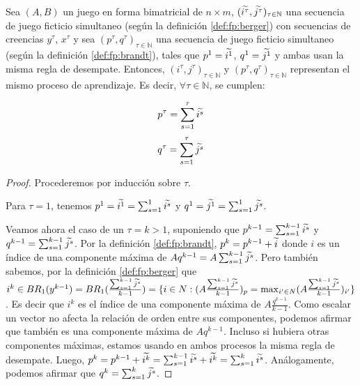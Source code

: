 \begin{lemma} \label{lema:equiv:sim}
    Sea $(A, B)$ un juego en forma bimatricial de $n \times m$, $(\widetilde{i^\tau}, \widetilde{j^\tau})_{\tau \in \mathbb{N}}$ una secuencia de juego ficticio simultaneo (según la definición \ref{def:fp:berger}) con secuencias de creencias $y^\tau$, $x^\tau$ y sea $(p^\tau, q^\tau)_{\tau \in \mathbb{N}}$ una secuencia de juego ficticio simultaneo (según la definición \ref{def:fp:brandt}), tales que $p^1 = \widetilde{i^1}$, $q^1 = \widetilde{j^1}$ y ambas usan la misma regla de desempate. Entonces, $(i^\tau, j^\tau)_{\tau \in \mathbb{N}}$ y $(p^\tau, q^\tau)_{\tau \in \mathbb{N}}$ representan el mismo proceso de aprendizaje. Es decir, $\forall \tau \in \mathbb{N}$, se cumplen:

    \[ p^{\tau} = \sum_{s=1}^\tau{\widetilde{i^s}} \]
    \[ q^{\tau} = \sum_{s=1}^\tau{\widetilde{j^s}} \]

\end{lemma}
\begin{proof}
    Procederemos por inducción sobre $\tau$.

    Para $\tau = 1$, tenemos $p^1 = \widetilde{i^1} = \sum_{s=1}^1{\widetilde{i^s}}$ y $q^1 = \widetilde{j^1} = \sum_{s=1}^1{\widetilde{j^s}}$.

    Veamos ahora el caso de un $\tau = k > 1$, suponiendo que $p^{k-1} = \sum_{s=1}^{k-1}{\widetilde{i^s}}$ y $q^{k-1} = \sum_{s=1}^{k-1}{\widetilde{j^s}}$. Por la definición \ref{def:fp:brandt}, $p^k = p^{k-1} + \widetilde{i}$ donde $i$ es un índice de una componente máxima de $Aq^{k-1} = A\sum_{s=1}^{k-1}{\widetilde{j^s}}$. Pero también sabemos, por la definición \ref{def:fp:berger} que $i^k \in BR_1(y^{k-1}) = BR_1(\frac{\sum_{s=1}^{k-1} \widetilde{j^s}}{k-1}) = \{i \in N : (A\frac{\sum_{s=1}^{k-1} \widetilde{j^s}}{k-1})_p = \max_{i' \in N} (A\frac{\sum_{s=1}^{k-1} \widetilde{j^s}}{k-1})_{i'}\}$. Es decir que $i^k$ es el índice de una componente máxima de $A\frac{q^{k-1}}{k-1}$. Como escalar un vector no afecta la relación de orden entre sus componentes, podemos afirmar que también es una componente máxima de $Aq^{k-1}$. Incluso si hubiera otras componentes máximas, estamos usando en ambos procesos la misma regla de desempate. Luego, $p^k = p^{k-1} + \widetilde{i^k} = \sum_{s=1}^{k-1}{\widetilde{i^s}} + \widetilde{i^k} = \sum_{s=1}^{k}{\widetilde{i^s}}$. Análogamente, podemos afirmar que $q^{k} = \sum_{s=1}^k{\widetilde{j^s}}$.
\end{proof}

